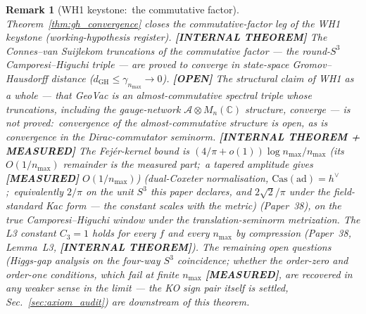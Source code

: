 \documentclass[11pt]{article}
\newtheorem{remark}{Remark}
\begin{document}
\begin{remark}[WH1 keystone:\ the commutative factor]
\label{rem:wh1_proven}
Theorem~\ref{thm:gh_convergence} closes the commutative-factor leg of the WH1 keystone (working-hypothesis register).
\textbf{[INTERNAL THEOREM]} The Connes--van Suijlekom truncations of
the commutative factor --- the round-$S^3$ Camporesi--Higuchi triple ---
are proved to converge in state-space Gromov--Hausdorff distance
($d_{\mathrm{GH}} \le \gamma_{n_{\max}} \to 0$).  \textbf{[OPEN]} The
structural claim of WH1 as a whole --- that GeoVac is an
almost-commutative spectral triple whose truncations, including the
gauge-network $\mathcal{A} \otimes M_n(\mathbb{C})$ structure, converge
--- is \emph{not} proved:\ convergence of the almost-commutative
structure is open, as is convergence in the Dirac-commutator seminorm.
\textbf{[INTERNAL THEOREM + MEASURED]} The Fej\'er-kernel bound is
$(4/\pi + o(1))\log n_{\max}/n_{\max}$ (its $O(1/n_{\max})$ remainder is the measured part;\ a tapered amplitude gives \textbf{[MEASURED]} $O(1/n_{\max})$) (dual-Coxeter normalisation, $\mathrm{Cas}(\mathrm{ad}) = h^\vee$;\ equivalently $2/\pi$ on the unit $S^3$ this paper declares, and $2\sqrt2/\pi$ under the field-standard Kac form --- the constant scales with the metric) (Paper~38), on the true Camporesi--Higuchi window under the translation-seminorm metrization.  The L3 constant $C_3 = 1$ holds for every $f$ and every $n_{\max}$ by compression (Paper~38, Lemma~L3, \textbf{[INTERNAL THEOREM]}). The
remaining open questions (Higgs-gap analysis on the four-way $S^3$
coincidence; whether the order-zero and order-one conditions, which
fail at finite $n_{\max}$ \textbf{[MEASURED]}, are recovered in any weaker
sense in the limit --- the KO sign pair itself is settled,
Sec.~\ref{sec:axiom_audit}) are
downstream of this theorem.
\end{remark}
\end{document}
